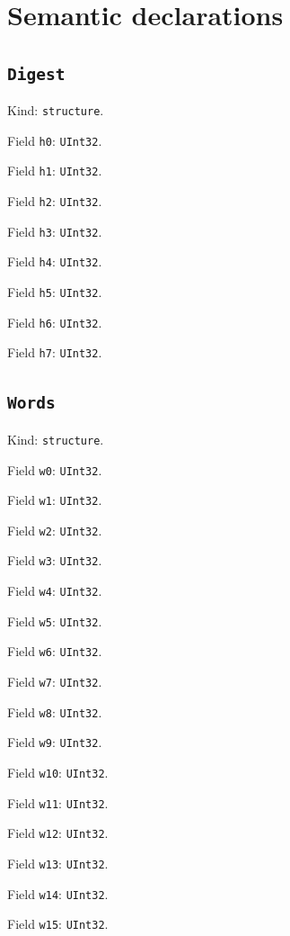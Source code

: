 \documentclass[11pt]{article}
\begin{document}
\section*{Semantic declarations}
\subsection*{\texttt{Digest}}
\noindent Kind: \texttt{structure}.\par
\noindent Field \texttt{h0}: \texttt{UInt32}.\par
\noindent Field \texttt{h1}: \texttt{UInt32}.\par
\noindent Field \texttt{h2}: \texttt{UInt32}.\par
\noindent Field \texttt{h3}: \texttt{UInt32}.\par
\noindent Field \texttt{h4}: \texttt{UInt32}.\par
\noindent Field \texttt{h5}: \texttt{UInt32}.\par
\noindent Field \texttt{h6}: \texttt{UInt32}.\par
\noindent Field \texttt{h7}: \texttt{UInt32}.\par
\subsection*{\texttt{Words}}
\noindent Kind: \texttt{structure}.\par
\noindent Field \texttt{w0}: \texttt{UInt32}.\par
\noindent Field \texttt{w1}: \texttt{UInt32}.\par
\noindent Field \texttt{w2}: \texttt{UInt32}.\par
\noindent Field \texttt{w3}: \texttt{UInt32}.\par
\noindent Field \texttt{w4}: \texttt{UInt32}.\par
\noindent Field \texttt{w5}: \texttt{UInt32}.\par
\noindent Field \texttt{w6}: \texttt{UInt32}.\par
\noindent Field \texttt{w7}: \texttt{UInt32}.\par
\noindent Field \texttt{w8}: \texttt{UInt32}.\par
\noindent Field \texttt{w9}: \texttt{UInt32}.\par
\noindent Field \texttt{w10}: \texttt{UInt32}.\par
\noindent Field \texttt{w11}: \texttt{UInt32}.\par
\noindent Field \texttt{w12}: \texttt{UInt32}.\par
\noindent Field \texttt{w13}: \texttt{UInt32}.\par
\noindent Field \texttt{w14}: \texttt{UInt32}.\par
\noindent Field \texttt{w15}: \texttt{UInt32}.\par
\end{document}
